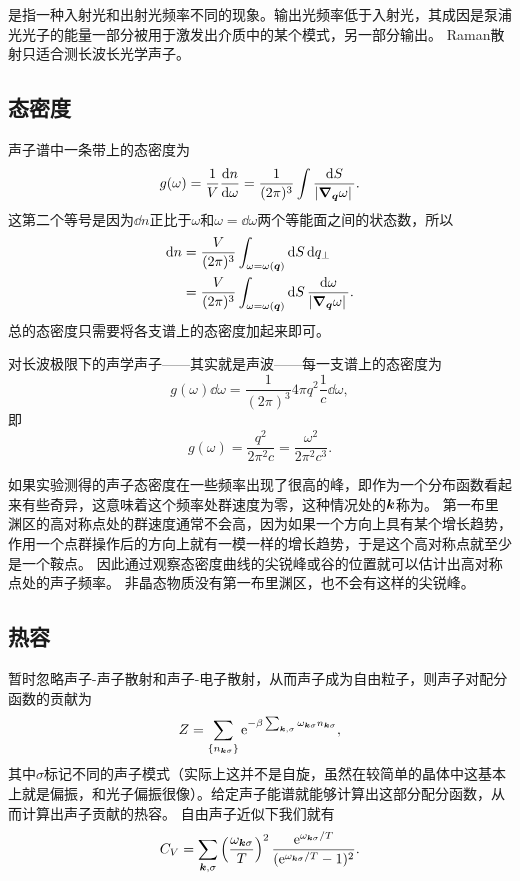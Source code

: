 是指一种入射光和出射光频率不同的现象。输出光频率低于入射光，其成因是泵浦光光子的能量一部分被用于激发出介质中的某个模式，另一部分输出。
Raman散射只适合测长波长光学声子。

\subsection{态密度}

声子谱中一条带上的态密度为
\begin{equation}
    g(\omega) = \frac{1}{V} \dv{n}{\omega} = \frac{1}{(2\pi)^3} \int \frac{\dd{S}}{\abs*{\grad_{\vb*{q}} \omega}}.
\end{equation}
这第二个等号是因为$\dd{n}$正比于$\omega$和$\omega = \dd{\omega}$两个等能面之间的状态数，所以
\[
    \begin{aligned}
        \dd{n} &= \frac{V}{(2\pi)^3} \int_{\omega=\omega(\vb*{q})} \dd{S} \dd{q_\bot} \\
        &= \frac{V}{(2\pi)^3} \int_{\omega=\omega(\vb*{q})} \dd{S} \frac{\dd{\omega}}{\abs*{\grad_{\vb*{q}} \omega}}.
    \end{aligned}
\]
总的态密度只需要将各支谱上的态密度加起来即可。

对长波极限下的声学声子——其实就是声波——每一支谱上的态密度为
\[
    g(\omega) \dd{\omega} = \frac{1}{(2\pi)^3} 4\pi q^2 \frac{1}{c} \dd{\omega},
\]
即
\begin{equation}
    g(\omega) = \frac{q^2}{2\pi^2 c} = \frac{\omega^2}{2\pi^2 c^3}.
    \label{eq:linear-phonon-state-density}
\end{equation}

如果实验测得的声子态密度在一些频率出现了很高的峰，即作为一个分布函数看起来有些奇异，这意味着这个频率处群速度为零，这种情况处的$\vb*{k}$称为。
第一布里渊区的高对称点处的群速度通常不会高，因为如果一个方向上具有某个增长趋势，作用一个点群操作后的方向上就有一模一样的增长趋势，于是这个高对称点就至少是一个鞍点。
因此通过观察态密度曲线的尖锐峰或谷的位置就可以估计出高对称点处的声子频率。
非晶态物质没有第一布里渊区，也不会有这样的尖锐峰。

\subsection{热容}\label{sec:lattice-special-heat}

暂时忽略声子-声子散射和声子-电子散射，从而声子成为自由粒子，则声子对配分函数的贡献为
\begin{equation}
    Z = \sum_{\{n_{\vb*{k} \sigma}\}} \mathrm{e}^{-\beta \sum_{\vb*{k}, \sigma} \omega_{\vb*{k} \sigma} n_{\vb*{k} \sigma}},
\end{equation}
其中$\sigma$标记不同的声子模式（实际上这并不是自旋，虽然在较简单的晶体中这基本上就是偏振，和光子偏振很像）。给定声子能谱就能够计算出这部分配分函数，从而计算出声子贡献的热容。
自由声子近似下我们就有
\begin{equation}
    C_V = \sum_{\vb*{k}, \sigma} \left(\frac{\omega_{\vb*{k}\sigma}}{T}\right)^2 \frac{\mathrm{e}^{\omega_{\vb*{k}\sigma} / T}}{(\mathrm{e}^{\omega_{\vb*{k}\sigma} / T} - 1)^2}.
    \label{eq:free-phonon-special-heat}
\end{equation}

